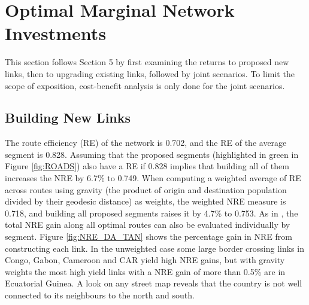 \documentclass[a4paper]{article}
\begin{document}
\section{Optimal Marginal Network Investments}

This section follows \citet{krantz2024optimal} Section 5 by first examining the returns to proposed new links, then to upgrading existing links, followed by joint scenarios. To limit the scope of exposition, cost-benefit analysis is only done for the joint scenarios. 

\subsection{Building New Links}

The route efficiency (RE) of the network is 0.702, and the RE of the average segment is 0.828. Assuming that the proposed segments (highlighted in green in Figure \ref{fig:ROADS}) also have a RE if 0.828 implies that building all of them increases the NRE by 6.7\% to 0.749. When computing a weighted average of RE across routes using gravity (the product of origin and destination population divided by their geodesic distance) as weights, the weighted NRE measure is 0.718, and building all proposed segments raises it by 4.7\% to 0.753. As in \citet{krantz2024optimal}, the total NRE gain along all optimal routes can also be evaluated individually by segment. Figure \ref{fig:NRE_DA_TAN} shows the percentage gain in NRE from constructing each link. In the unweighted case some large border crossing links in Congo, Gabon, Cameroon and CAR yield high NRE gains, but with gravity weights the most high yield links with a NRE gain of more than 0.5\% are in Ecuatorial Guinea. A look on any street map reveals that the country is not well connected to its neighbours to the north and south.
\end{document}

